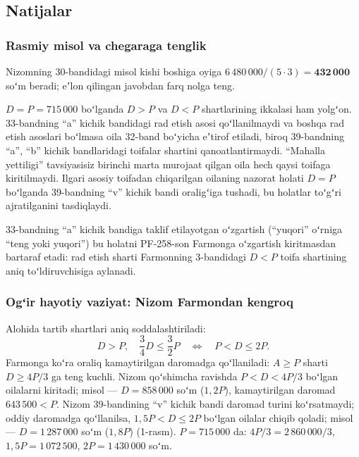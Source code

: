 \documentclass[14pt,a4paper]{extarticle}
\begin{document}
\subsection{Natijalar}
\subsubsection{Rasmiy misol va chegaraga tenglik}\label{res:eq}
Nizomning 30-bandidagi misol kishi boshiga oyiga $6\,480\,000/(5\cdot3)=\mathbf{432\,000}$ soʻm beradi; eʼlon qilingan javobdan farq nolga teng.

$D=P=715\,000$ boʻlganda $D>P$ va $D<P$ shartlarining ikkalasi ham yolgʻon. 33-bandning “a” kichik bandidagi rad etish asosi qoʻllanilmaydi va boshqa rad etish asoslari boʻlmasa oila 32-band boʻyicha eʼtirof etiladi, biroq 39-bandning “a”, “b” kichik bandlaridagi toifalar shartini qanoatlantirmaydi. “Mahalla yettiligi” tavsiyasisiz birinchi marta murojaat qilgan oila hech qaysi toifaga kiritilmaydi. Ilgari asosiy toifadan chiqarilgan oilaning nazorat holati $D=P$ boʻlganda 39-bandning “v” kichik bandi oraligʻiga tushadi, bu holatlar toʻgʻri ajratilganini tasdiqlaydi.

33-bandning “a” kichik bandiga taklif etilayotgan oʻzgartish (“yuqori” oʻrniga “teng yoki yuqori”) bu holatni PF-258-son Farmonga oʻzgartish kiritmasdan bartaraf etadi: rad etish sharti Farmonning 3-bandidagi $D<P$ toifa shartining aniq toʻldiruvchisiga aylanadi.

\subsubsection{Ogʻir hayotiy vaziyat: Nizom Farmondan kengroq}\label{res:hard}
Alohida tartib shartlari aniq soddalashtiriladi:
\begin{equation}
D>P,\quad\frac34D\le\frac32P\quad\Longleftrightarrow\quad P<D\le2P.
\end{equation}
Farmonga koʻra oraliq kamaytirilgan daromadga qoʻllaniladi: $A\ge P$ sharti $D\ge4P/3$ ga teng kuchli. Nizom qoʻshimcha ravishda $P<D<4P/3$ boʻlgan oilalarni kiritadi; misol — $D=858\,000$ soʻm ($1{,}2P$), kamaytirilgan daromad $643\,500<P$. Nizom 39-bandining “v” kichik bandi daromad turini koʻrsatmaydi; oddiy daromadga qoʻllanilsa, $1{,}5P<D\le2P$ boʻlgan oilalar chiqib qoladi; misol — $D=1\,287\,000$ soʻm ($1{,}8P$) (1-rasm). $P=715\,000$ da: $4P/3=2\,860\,000/3$, $1{,}5P=1\,072\,500$, $2P=1\,430\,000$ soʻm.
\end{document}
